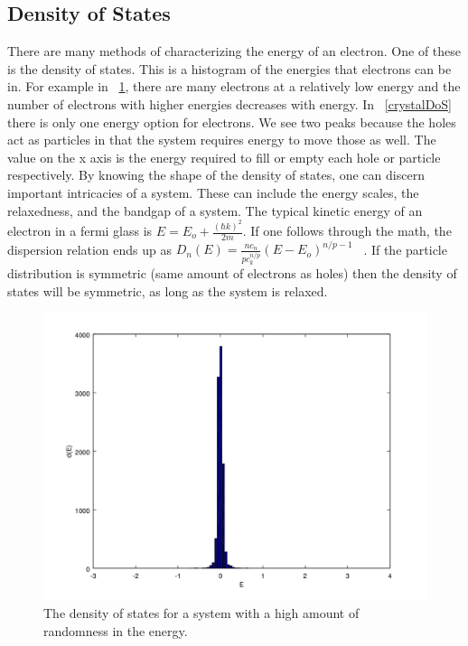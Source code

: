 \subsection{Density of States}
There are many methods of characterizing the energy of an electron. One of these is the density of states. This is a histogram of the energies that electrons can be in. For example in ~\ref{moundDoS}, there are many electrons at a relatively low energy and the number of electrons with higher energies decreases with energy. In ~\ref{crystalDoS} there is only one energy option for electrons. We see two peaks because the holes act as particles in that the system requires energy to move those as well. The value on the x axis is the energy required to fill or empty each hole or particle respectively. By knowing the shape of the density of states, one can discern important intricacies of a system. These can include the energy scales, the relaxedness, and the bandgap of a system. The typical kinetic energy of an electron in a fermi glass is $E = E_o + \frac{(\hbar k)^2} {2m}$. If one follows through the math, the dispersion relation ends up as $D_n(E) = \frac {nc_n} {p c^{n/p}_k} (E- E_o)^{n/p-1}$ ~\cite{Kittel96}. If the particle distribution is symmetric (same amount of electrons as holes) then the density of states will be symmetric, as long as the system is relaxed.

\begin{figure}[htbp]
\begin{center}
\includegraphics[scale=.50]{veryCloseDos.png}
\caption{The density of states for a system with a high amount of randomness in the energy.}
\label{moundDoS}
\end{center}
\end{figure}

